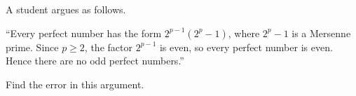 A student argues as follows.

``Every perfect number has the form $2^{p-1}(2^p-1)$, where $2^p-1$ is a Mersenne prime. Since $p\ge 2$, the factor $2^{p-1}$ is even, so every perfect number is even. Hence there are no odd perfect numbers.''

Find the error in this argument.
